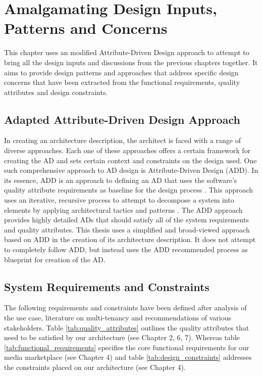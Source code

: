 \chapter{Amalgamating Design Inputs, Patterns and Concerns}
This chapter uses an modified Attribute-Driven Design approach to attempt to bring all the design inputs and discussions from the previous chapters together. It aims to provide  design patterns and approaches that address specific design concerns  that have been extracted from the functional requirements,  quality attributes and design constraints.

\section{Adapted Attribute-Driven Design Approach}
 \label{sec:add} 
In creating an architecture description, the architect is faced with a range of diverse approaches. Each one of these approaches offers a certain framework for creating the AD and sets certain context and constraints on the design used. One such comprehensive approach to AD design is Attribute-Driven Design (ADD). In its essence, ADD is an approach to defining an AD that uses the software's quality attribute requirements as baseline for the design process \cite{Wojcik2006}. This approach uses an iterative, recursive process to attempt to decompose a system into elements by applying architectural tactics and patterns \cite{Wojcik2006}. The ADD approach provides highly detailed ADs that should satisfy all of the system requirements and quality attributes. This thesis uses a simplified and broad-viewed approach based on ADD in the creation of its architecture description. It does not attempt to completely follow ADD, but instead uses the ADD recommended process as blueprint for creation of the AD.

\section{System Requirements and Constraints}
\label{sec:reqandconstraints}
The following requirements and constraints have been defined after analysis of the use case, literature on multi-tenancy and recommendations of various stakeholders. Table \ref{tab:quality_attributes} outlines the quality attributes that need to be satisfied by our architecture (see Chapter 2, 6, 7). Whereas table \ref{tab:functional_requirements} specifies the core functional requirements for our media marketplace  (see Chapter 4) and table \ref{tab:design_constraints} addresses the constraints placed on our architecture  (see Chapter 4). 


